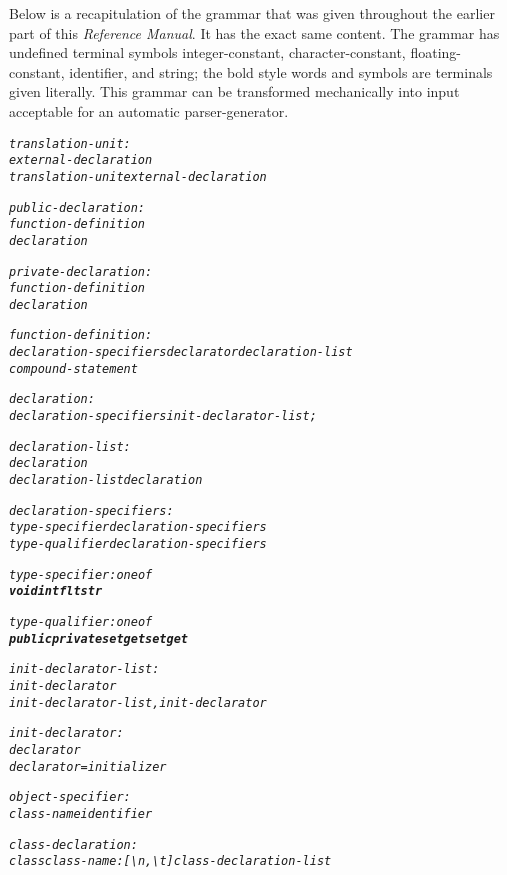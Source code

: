\documentclass[12pt]{report}
\begin{document}
\begin{doublespace}
Below is a recapitulation of the grammar that was given throughout the earlier part of this \textit{Reference Manual}. It has the exact same content.
The grammar has undefined terminal symbols integer-constant, character-constant, floating-constant, identifier, and string; the bold style words and symbols are terminals given literally. This grammar can be transformed mechanically into input acceptable for an automatic parser-generator. 
\end{doublespace}
\begin{alltt}
     \textit{translation-unit:}
          \textit{external-declaration}
          \textit{translation-unit external-declaration}
          
     \textit{public-declaration:}
          \textit{function-definition}
          \textit{declaration}
          
     \textit{private-declaration:}
          \textit{function-definition}
          \textit{declaration}
          
     \textit{function-definition:}
          \textit{declaration-specifiers declarator declaration-list
               compound-statement}
               
     \textit{declaration:}
          \textit{declaration-specifiers init-declarator-list;}
          
     \textit{declaration-list:}
          \textit{declaration}
          \textit{declaration-list declaration}
          
     \textit{declaration-specifiers:}
          \textit{type-specifier declaration-specifiers}
          \textit{type-qualifier declaration-specifiers}
          
     \textit{type-specifier: one of}
          \textit{\textbf{void   int   flt   str}}
          
     \textit{type-qualifier: one of}
          \textit{\textbf{public   private   set   get  setget}}
          
     \textit{init-declarator-list:}
          \textit{init-declarator}
          \textit{init-declarator-list, init-declarator}
          
     \textit{init-declarator:}
          \textit{declarator}
          \textit{declarator = initializer}
          
     \textit{object-specifier:}
          \textit{class-name identifier}
          
     \textit{class-declaration:}
          \textit{class class-name: [\textbackslash{n}, \textbackslash{t}] class-declaration-list}
          

\end{alltt}
\end{document}
